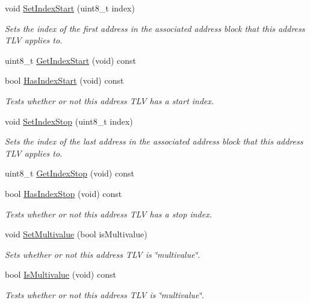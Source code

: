 \begin{DoxyCompactItemize}
\item 
void \hyperlink{classns3_1_1PbbAddressTlv_a82d685ae4e4e2f6d2532cb212f5b2797}{Set\+Index\+Start} (uint8\+\_\+t index)
\begin{DoxyCompactList}\small\item\em Sets the index of the first address in the associated address block that this address T\+LV applies to. \end{DoxyCompactList}\item 
uint8\+\_\+t \hyperlink{classns3_1_1PbbAddressTlv_a11e46ebc638b09b0d6b1181021350fbe}{Get\+Index\+Start} (void) const 
\item 
bool \hyperlink{classns3_1_1PbbAddressTlv_abd1c2811234e6f5b0e6754050a8f24c3}{Has\+Index\+Start} (void) const 
\begin{DoxyCompactList}\small\item\em Tests whether or not this address T\+LV has a start index. \end{DoxyCompactList}\item 
void \hyperlink{classns3_1_1PbbAddressTlv_af37ebd0d99b8b894fee7cca449d7adb9}{Set\+Index\+Stop} (uint8\+\_\+t index)
\begin{DoxyCompactList}\small\item\em Sets the index of the last address in the associated address block that this address T\+LV applies to. \end{DoxyCompactList}\item 
uint8\+\_\+t \hyperlink{classns3_1_1PbbAddressTlv_af00916a1c913b958530d886b622cb8f7}{Get\+Index\+Stop} (void) const 
\item 
bool \hyperlink{classns3_1_1PbbAddressTlv_abffbffcf6721e7ee2de4e52e32d57309}{Has\+Index\+Stop} (void) const 
\begin{DoxyCompactList}\small\item\em Tests whether or not this address T\+LV has a stop index. \end{DoxyCompactList}\item 
void \hyperlink{classns3_1_1PbbAddressTlv_a305d359c769545937dc5f1fb20d74d1a}{Set\+Multivalue} (bool is\+Multivalue)
\begin{DoxyCompactList}\small\item\em Sets whether or not this address T\+LV is \char`\"{}multivalue\char`\"{}. \end{DoxyCompactList}\item 
bool \hyperlink{classns3_1_1PbbAddressTlv_a1d1f2215ae5fb697aaaf83801c8f0c42}{Is\+Multivalue} (void) const 
\begin{DoxyCompactList}\small\item\em Tests whether or not this address T\+LV is \char`\"{}multivalue\char`\"{}. \end{DoxyCompactList}\end{DoxyCompactItemize}
